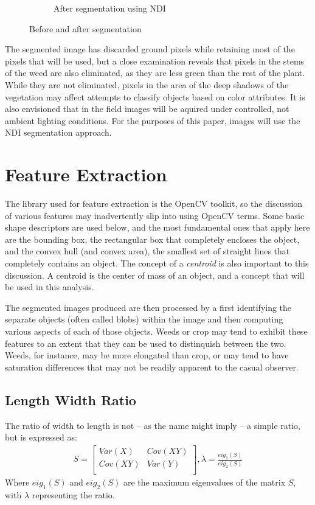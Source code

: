 \documentclass[letterpaper]{article}
\begin{document}
{\begin{figure}[H]
\begin{subfigure}{.32\textwidth}
  \caption{After segmentation using NDI}
  \label{fig:sub2}
\end{subfigure}
\caption{Before and after segmentation}
\label{fig:segmentation}
\end{figure}
The segmented image has discarded ground pixels while retaining most of the pixels that will be used, but a close examination reveals that pixels in the stems of the weed are also eliminated, as they are less green than the rest of the plant. While they are not eliminated, pixels in the area of the deep shadows of the vegetation may affect attempts to classify objects based on color attributes. It is also envisioned that in the field images will be aquired under controlled, not ambient lighting conditions. For the purposes of this paper, images will use the NDI segmentation approach.


\section{Feature Extraction}
The library used for feature extraction is the OpenCV toolkit, so the discussion of various features may inadvertently slip into using OpenCV terms. Some basic shape descriptors are used below, and the most fundamental ones that apply here are the bounding box, the rectangular box that completely encloses the object, and the convex hull (and convex area), the smallest set of straight lines that completely contains an object. The concept of a {\it centroid} is also important to this discussion.  A centroid is the center of mass of an object, and a concept that will be used in this analysis.

The segmented images produced are then processed by a first identifying the separate objects (often called blobs) within the image and then computing various aspects of each of those objects. Weeds or crop may tend to exhibit these features to an extent that they can be used to distinquish between the two.  Weeds, for instance, may be more elongated than crop, or may tend to have saturation differences that may not be readily apparent to the casual observer.
\subsection{Length Width Ratio}
The ratio of width to length is not -- as the name might imply -- a simple ratio, but is expressed as:
\begin{eqnarray*}
S = 
	\begin{bmatrix}
	Var(X) & Cov(XY) \\[0.3em]
	Cov(XY) & Var(Y) \\[0.3em]
	\end{bmatrix},
\lambda = \frac {eig_{1}(S)} {eig_{2}(S)}
\end{eqnarray*}
Where $eig_{1}(S)$ and $eig_{2}(S)$ are the maximum eigenvalues of the matrix $S$, with $\lambda$ representing the ratio. \cite{Lin2017-xq}
}
\end{document}
